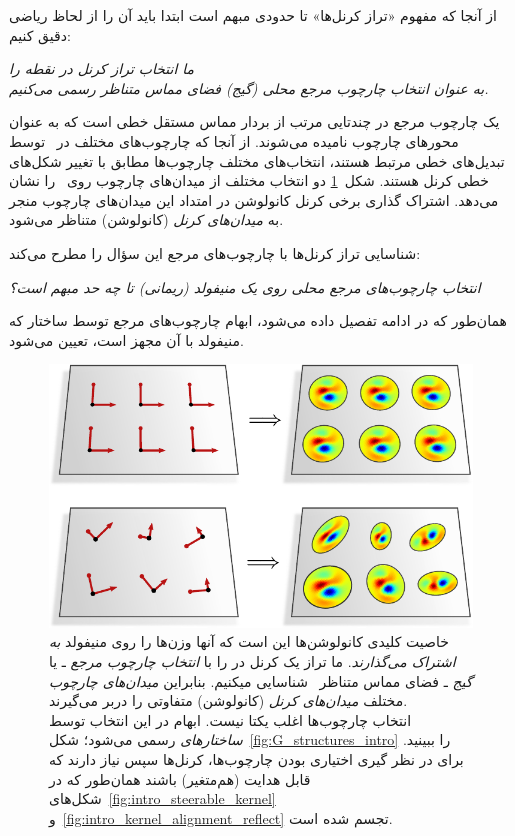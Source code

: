 از آنجا که مفهوم «تراز کرنل‌ها» تا حدودی مبهم است
ابتدا باید آن را از لحاظ ریاضی دقیق کنیم:

\begin{minipage}{\textwidth}
	\begin{center}\it
		ما انتخاب تراز کرنل در نقطه  را \\
		به عنوان انتخاب چارچوب مرجع محلی (گیج)
		فضای مماس متناظر \lr{$\TpM$} رسمی می‌کنیم.
	\end{center}
\end{minipage}

یک چارچوب مرجع در  چندتایی مرتب \lr{$[e_1,\, \dots,\, e_d]$} از  بردار مماس مستقل خطی  است که به عنوان محورهای چارچوب نامیده می‌شوند.
از آنجا که چارچوب‌های مختلف در~ توسط تبدیل‌های خطی مرتبط هستند، انتخاب‌های مختلف چارچوب‌ها مطابق با تغییر شکل‌های خطی کرنل هستند.
شکل~\ref{fig:intro_kernel_alignment_trivial} دو انتخاب مختلف از میدان‌های چارچوب روی~ را نشان می‌دهد.
اشتراک گذاری برخی کرنل کانولوشن در امتداد این میدان‌های چارچوب منجر به \emph{میدان‌های کرنل} (کانولوشن) متناظر می‌شود.


شناسایی تراز کرنل‌ها با چارچوب‌های مرجع این سؤال را مطرح می‌کند:
\begin{center}\it
	انتخاب چارچوب‌های مرجع محلی روی یک منیفولد (ریمانی) تا چه حد مبهم است؟
\end{center}
همان‌طور که در ادامه تفصیل داده می‌شود، ابهام چارچوب‌های مرجع توسط ساختار  که منیفولد با آن مجهز است، تعیین می‌شود.


\begin{figure}
	\centering
	\includegraphics[width=.62\textwidth]{figures/intro_kernel_alignment_trivial.pdf}
	\captionsetup{width=.9\textwidth}
	\caption{\small
		خاصیت کلیدی کانولوشن‌ها این است که آنها وزن‌ها را روی منیفولد \emph{به اشتراک می‌گذارند}.
		ما تراز یک کرنل در  را با \emph{انتخاب چارچوب مرجع} ـ یا \emph{گیج} ـ فضای مماس متناظر~\lr{$\TpM$} شناسایی میکنیم.
		بنابراین \emph{میدان‌های چارچوب} مختلف \emph{میدان‌های کرنل} (کانولوشن) متفاوتی را دربر می‌گیرند.
		\\[1ex]
		انتخاب چارچوب‌ها اغلب یکتا نیست.
		ابهام در این انتخاب توسط \emph{ساختارهای}  رسمی می‌شود؛ شکل~\ref{fig:G_structures_intro} را ببینید.
		برای در نظر گیری اختیاری بودن چارچوب‌ها، کرنل‌ها سپس نیاز دارند که قابل هدایت  (هم‌متغیر) باشند همان‌طور که در شکل‌های~\ref{fig:intro_steerable_kernel} و~\ref{fig:intro_kernel_alignment_reflect} تجسم شده است.
		\\[0pt]
	}
	\label{fig:intro_kernel_alignment_trivial}
\end{figure}





